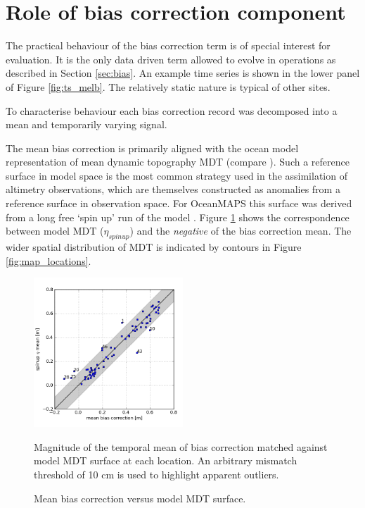 \section{Role of bias correction component}
\label{sec:bias_more}

The practical behaviour of the bias correction term is of special interest for evaluation.   
It is the only data driven term allowed to evolve in operations as described in Section \ref{sec:bias}.
An example time series is shown in the lower panel of Figure \ref{fig:ts_melb}.
The relatively static nature is typical of other sites.


To characterise behaviour each bias correction record was decomposed into a mean and temporarily varying signal.

The mean bias correction is primarily aligned with the ocean model representation of mean dynamic topography MDT (compare \citep{Slobbe:wk}).
Such a reference surface in model space is the most common strategy used in the assimilation of altimetry observations, which are themselves constructed as anomalies from a reference surface in observation space. For OceanMAPS this surface was derived from a long free `spin up' run of the model \citep{Oke:2013fm}. 
Figure \ref{fig:bias_mean} shows the correspondence between model MDT ($\eta_{spinup}$) and the \textit{negative} of the bias correction mean.   The wider spatial distribution of MDT is indicated by contours in Figure \ref{fig:map_locations}.

\begin{figure}[H]
\centering
\includegraphics[width=0.5\textwidth]{figures/plots/aggSL_bias_breakdown_plot_1.png}
\caption{Mean bias correction versus model  MDT surface.}{Magnitude of the temporal mean of bias correction matched against model MDT surface at each location. An arbitrary mismatch threshold of 10 cm is used to highlight apparent outliers.}
\label{fig:bias_mean}
\end{figure}   

